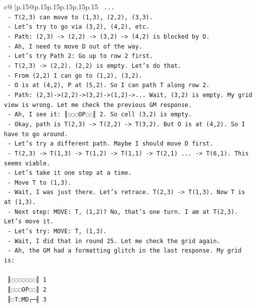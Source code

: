 \documentclass{article}
\begin{document}
{\begin{supertabular}{c@{$\;$}|p{.15\linewidth}@{}p{.15\linewidth}p{.15\linewidth}p{.15\linewidth}p{.15\linewidth}p{.15\linewidth}}
{{{\texttt{     ...} \\
\texttt{   {-} T(2,3) can move to (1,3), (2,2), (3,3).} \\
\texttt{   {-} Let's try to go via (3,2), (4,2), etc.} \\
\texttt{   {-} Path: (2,3) {-}> (2,2) {-}> (3,2) {-}> (4,2) is blocked by O.} \\
\texttt{   {-} Ah, I need to move D out of the way.} \\
\texttt{   {-} Let's try Path 2: Go up to row 2 first.} \\
\texttt{   {-} T(2,3) {-}> (2,2). (2,2) is empty. Let's do that.} \\
\texttt{   {-} From (2,2) I can go to (1,2), (3,2).} \\
\texttt{   {-} O is at (4,2), P at (5,2). So I can path T along row 2.} \\
\texttt{   {-} Path: (2,3){-}>(2,2){-}>(3,2){-}>(1,2){-}>... Wait, (3,2) is empty. My grid view is wrong. Let me check the previous GM response.} \\
\texttt{   {-} Ah, I see it: ║◌◌◌OP◌◌║ 2. So cell (3,2) is empty.} \\
\texttt{   {-} Okay, path is T(2,3) {-}> T(2,2) {-}> T(3,2). But O is at (4,2). So I have to go around.} \\
\texttt{   {-} Let's try a different path. Maybe I should move D first.} \\
\texttt{   {-} T(2,3) {-}> T(1,3) {-}> T(1,2) {-}> T(1,1) {-}> T(2,1) ... {-}> T(6,1). This seems viable.} \\
\texttt{   {-} Let's take it one step at a time.} \\
\texttt{   {-} Move T to (1,3).} \\
\texttt{   {-} Wait, I was just there. Let's retrace. T(2,3) {-}> T(1,3). Now T is at (1,3).} \\
\texttt{   {-} Next step: MOVE: T, (1,2)? No, that's one turn. I am at T(2,3). Let's move it.} \\
\texttt{   {-} Let's try: MOVE: T, (1,3).} \\
\texttt{   {-} Wait, I did that in round 25. Let me check the grid again.} \\
\texttt{   {-} Ah, the GM had a formatting glitch in the last response. My grid is:} \\
\\ 
\texttt{   ║◌◌◌◌◌◌◌║ 1} \\
\texttt{   ║◌◌◌OP◌◌║ 2} \\
\texttt{   ║◌T◌MD┌─╢ 3} \\
}}}
\end{supertabular}}
\end{document}
